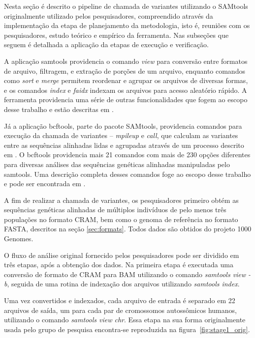 \documentclass[cic,tc]{iiufrgs}
\begin{document}
Nesta seção é descrito o pipeline de chamada de variantes utilizando o SAMtools
originalmente utilizado pelos pesquisadores, compreendido através da
implementação da etapa de planejamento da metodologia, isto é, reuniões com os
pesquisadores, estudo teórico e empírico da ferramenta. Nas subseções que
seguem é detalhada a aplicação da etapas de execução e verificação.

A aplicação samtools providencia o comando \textit{view} para conversão entre
formatos de arquivo, filtragem, e extração de porções de um arquivo, enquanto
comandos como \textit{sort} e \textit{merge} permitem reordenar e agrupar os
arquivos de diversas formas, e os comandos \textit{index} e \textit{faidx}
indexam os arquivos para acesso aleatório rápido. A ferramenta providencia uma
série de outras funcionalidades que fogem ao escopo desse trabalho e estão
descritas em \cite{danecek2021twelve}.

Já a aplicação bcftools, parte do pacote SAMtools, providencia comandos para
execução da chamada de variantes -- \textit{mpileup} e \textit{call}, que
calculam as variantes entre as sequências alinhadas lidas e agrupadas através
de um processo descrito em \cite{li2011improving}. O bcftools providencia mais
21 comandos com mais de 230 opções diferentes para diversas análises das
sequências genéticas alinhadas manipuladas pelo samtools. Uma descrição
completa desses comandos foge ao escopo desse trabalho e pode ser encontrada em
\cite{danecek2021twelve}.

A fim de realizar a chamada de variantes, os pesquisadores primeiro obtém as
sequências genéticas alinhadas de múltiplos indivíduos de pelo menos três
populações no formato CRAM, bem como o genoma de referência no formato FASTA,
descritos na seção \ref{sec:formats}. Todos dados são obtidos do projeto 1000
Genomes.

O fluxo de análise original fornecido pelos pesquisadores pode ser dividido em
três etapas, após a obtenção dos dados. Na primeira etapa é executada uma
conversão de formato de CRAM para BAM utilizando o comando \textit{samtools
view -b}, seguida de uma rotina de indexação dos arquivos utilizando
\textit{samtools index}.

Uma vez convertidos e indexados, cada arquivo de entrada é separado em 22
arquivos de saída, um para cada par de cromossomos autossômicos humanos,
utilizando o comando \textit{samtools view chr}. Essa etapa na sua forma
originalmente usada pelo grupo de pesquisa encontra-se reproduzida na
figura~\ref{fig:stage1_orig}.
\end{document}
